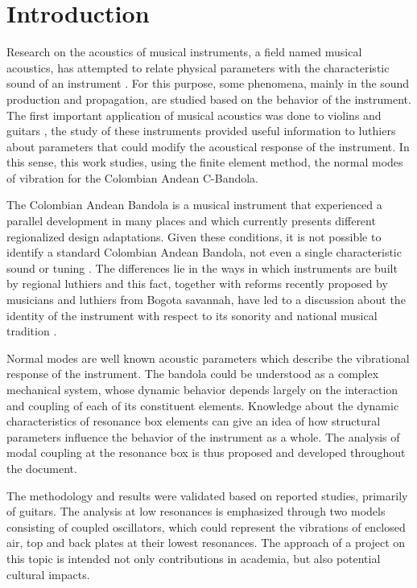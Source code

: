 \section{Introduction}

Research on the acoustics of musical instruments, a field named musical acoustics, has attempted to relate physical parameters with the characteristic sound of an instrument \cite{Caldersmith1, Christensen, Christensen3, Dickens1, Firth1, Rossing, Rossing1, Rossing3, Jannsson, Jansson:GuitarModes, Knotta, Marshall, Meyer, Meyer2, Boullosa, Richardson, Molin, Stetson, Woodhouse, J.Torres1, J.Torres, Elejabarrieta, French, Boullosa1, Boullosa2, Caldersmith, Hutchins}. For this purpose, some phenomena, mainly in the sound production and propagation, are studied based on the behavior of the instrument. The first important application of musical acoustics was done to violins and guitars \cite{Caldersmith1, Christensen, Christensen3, Dickens1, Firth1, Rossing, Rossing1, Rossing3, Jannsson, Jansson:GuitarModes, Knotta, Marshall, Meyer, Meyer2, Boullosa, Richardson, Molin, Stetson, Woodhouse, J.Torres1, J.Torres, Elejabarrieta, French, Boullosa1, Boullosa2, Caldersmith, Hutchins}, the study of these instruments provided useful information to luthiers about parameters that could modify the acoustical response of the instrument. In this sense, this work studies, using the finite element method, the normal modes of vibration for the Colombian Andean C-Bandola.

The Colombian Andean Bandola is a musical instrument that experienced a parallel development in many places and which currently presents different regionalized design adaptations. Given these conditions, it is not possible to identify a standard Colombian Andean Bandola, not even a single characteristic sound or tuning \cite{thesis:bandola}. The differences lie in the ways in which instruments are built by regional luthiers and this fact, together with reforms recently proposed by musicians and luthiers from Bogota savannah, have led to a discussion about the identity of the instrument with respect to its sonority and national musical tradition \cite{thesis:bandola}.

Normal modes are well known acoustic parameters which describe the vibrational response of the instrument. The bandola could be understood as a complex mechanical system, whose dynamic behavior depends largely on the interaction and coupling of each of its constituent elements. Knowledge about the dynamic characteristics of resonance box elements can give an idea of how structural parameters influence the behavior of the instrument as a whole. The analysis of modal coupling at the resonance box is thus proposed and developed throughout the document. 

The methodology and results were validated based on reported studies, primarily of guitars. The analysis at low resonances is emphasized through two models consisting of coupled oscillators, which could represent the vibrations of enclosed air, top and back plates at their lowest resonances. The approach of a project on this topic is intended not only contributions in academia, but also potential cultural impacts.